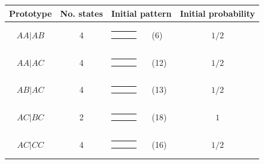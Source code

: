\documentclass[9pt,letterpaper,twoside]{article}
\begin{document}
{
\begin{center}
\begin{tabular}{ccrlc} \hline
Prototype & No. states & \multicolumn{2}{c}{Initial pattern} & Initial probability \\ \hline
$AA|AB$ & 4 & 
{\renewcommand{\arraystretch}{0.3}
\renewcommand{\tabcolsep}{0.5mm}
\parbox[b][3mm][c]{12mm}{
\begin{tabular}{|p{2mm}|p{2mm}||p{2mm}|} \hline
$\bullet$ &           &           \\
$\bullet$ & $\circ  $ &           \\ \hline
\end{tabular}}}
& (6) & $1/2$ \\
$AA|AC$ & 4 & 
{\renewcommand{\arraystretch}{0.3}
\renewcommand{\tabcolsep}{0.5mm}
\parbox[b][3mm][c]{12mm}{
\begin{tabular}{|p{2mm}|p{2mm}||p{2mm}|} \hline
$\bullet$ &           &           \\
$\bullet$ &           & $\circ  $ \\ \hline
\end{tabular}}}
& (12) & $1/2$ \\
$AB|AC$ & 4 & 
{\renewcommand{\arraystretch}{0.3}
\renewcommand{\tabcolsep}{0.5mm}
\parbox[b][3mm][c]{12mm}{
\begin{tabular}{|p{2mm}|p{2mm}||p{2mm}|} \hline
$\bullet$ &           &           \\
          & $\bullet$ & $\circ  $ \\ \hline
\end{tabular}}}
& (13) & $1/2$ \\
$AC|BC$ & 2 & 
{\renewcommand{\arraystretch}{0.3}
\renewcommand{\tabcolsep}{0.5mm}
\parbox[b][3mm][c]{12mm}{
\begin{tabular}{|p{2mm}|p{2mm}||p{2mm}|} \hline
          &           & $\bullet$ \\
$\bullet$ & $\circ  $ &           \\ \hline
\end{tabular}}}
& (18) & $1$ \\
$AC|CC$ & 4 & 
{\renewcommand{\arraystretch}{0.3}
\renewcommand{\tabcolsep}{0.5mm}
\parbox[b][3mm][c]{12mm}{
\begin{tabular}{|p{2mm}|p{2mm}||p{2mm}|} \hline
          &           & $\bullet$ \\
$\circ  $ &           & $\bullet$ \\ \hline
\end{tabular}}}
& (16) & $1/2$ \\
\hline
\end{tabular}
\end{center}
}
\end{document}
